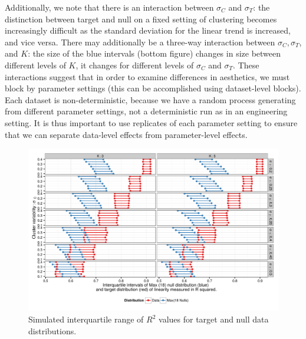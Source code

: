 \documentclass[11pt]{isuthesis}\usepackage[]{graphicx}\usepackage[]{color}
\newenvironment{knitrout}{}{} %
\begin{document}
Additionally, we note that there is an interaction between $\sigma_C$ and $\sigma_T$: the distinction between target and null on a fixed setting of clustering becomes increasingly difficult as the standard deviation for the linear trend is increased, and vice versa. There may additionally be a three-way interaction between $\sigma_C, \sigma_T$, and $K$: the size of the blue intervals (bottom figure) changes in size between different levels of $K$, it changes for different levels of $\sigma_C$ and $\sigma_T$. These interactions suggest that in order to examine differences in aesthetics, we must block by parameter settings (this can be accomplished using dataset-level blocks). Each dataset is non-deterministic, because we have a random process generating from different parameter settings, not a deterministic run as in an engineering setting. It is thus important to use replicates of each parameter setting to ensure that we can separate data-level effects from parameter-level effects. 



\begin{figure}[ht]\centering
\begin{knitrout}
\color{fgcolor}

{\centering \includegraphics[width=.8\linewidth]{Figure/FeatureHierarchy/fig-simulationparameters-r2-1} 

}



\end{knitrout}
\caption[Simulated interquartile range of $R^2$ values]{Simulated interquartile range of $R^2$ values for target and null data distributions. \label{fig:simulationLineIntervals}}
\end{figure}
\end{document}
